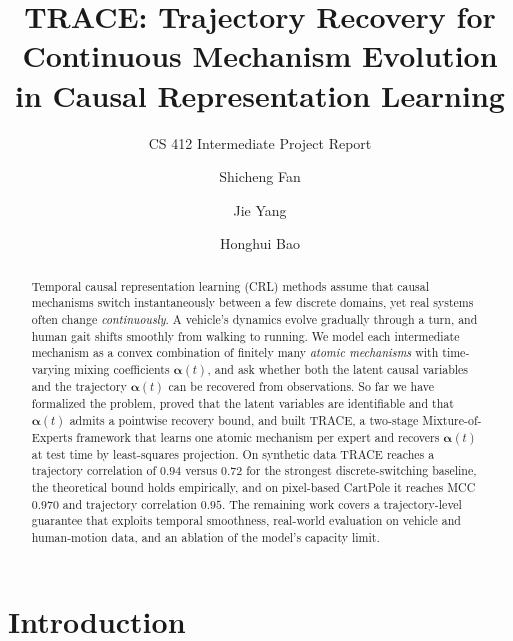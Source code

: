 \documentclass[sigconf,nonacm]{acmart}
\theoremstyle{plain}
\theoremstyle{definition}
\newcommand{\va}{\boldsymbol{\alpha}}
\begin{document}
\title{TRACE: Trajectory Recovery for Continuous Mechanism Evolution in Causal Representation Learning}
\subtitle{CS 412 Intermediate Project Report}

\author{Shicheng Fan}

\author{Jie Yang}

\author{Honghui Bao}

\begin{abstract}
Temporal causal representation learning (CRL) methods assume that causal mechanisms switch instantaneously between a few discrete domains, yet real systems often change \emph{continuously}. A vehicle's dynamics evolve gradually through a turn, and human gait shifts smoothly from walking to running. We model each intermediate mechanism as a convex combination of finitely many \emph{atomic mechanisms} with time-varying mixing coefficients $\va(t)$, and ask whether both the latent causal variables and the trajectory $\va(t)$ can be recovered from observations. So far we have formalized the problem, proved that the latent variables are identifiable and that $\va(t)$ admits a pointwise recovery bound, and built TRACE, a two-stage Mixture-of-Experts framework that learns one atomic mechanism per expert and recovers $\va(t)$ at test time by least-squares projection. On synthetic data TRACE reaches a trajectory correlation of $0.94$ versus $0.72$ for the strongest discrete-switching baseline, the theoretical bound holds empirically, and on pixel-based CartPole it reaches MCC $0.970$ and trajectory correlation $0.95$. The remaining work covers a trajectory-level guarantee that exploits temporal smoothness, real-world evaluation on vehicle and human-motion data, and an ablation of the model's capacity limit.
\end{abstract}

\maketitle

\section{Introduction}
\end{document}
